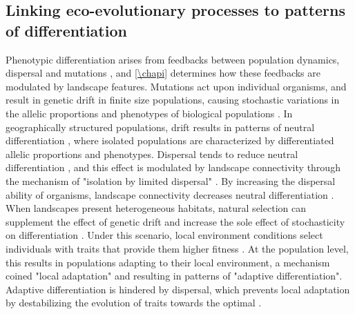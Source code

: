 \subsection{Linking eco-evolutionary processes to patterns of differentiation}

Phenotypic differentiation arises from feedbacks between population dynamics, dispersal and mutations \citep{hamilton2021population}, and \cref{\chapi} determines how these feedbacks are modulated by landscape features.
% 
Mutations act upon individual organisms, and result in genetic drift in finite size populations, causing stochastic variations in the allelic proportions and phenotypes of biological populations \citep{Slatkin1987a}.
% 
% 
In geographically structured populations, drift results in patterns of neutral differentiation \citep{Slatkin1987a}, where isolated populations are characterized by differentiated allelic proportions and phenotypes. 
% 
Dispersal tends to reduce neutral differentiation \citep{Slatkin1987a}, and this effect is modulated by landscape connectivity \citep{Wright1943,McRae2006,McRae2007} through the mechanism of "isolation by limited dispersal" \citep{Orsini2013}. By increasing the dispersal ability of organisms, landscape connectivity decreases neutral differentiation \citep{Lande1991}.
% 
When landscapes present heterogeneous habitats, natural selection can supplement the effect of genetic drift and increase the sole effect of stochasticity on differentiation \citep{fisher1958genetical}. Under this scenario, local environment conditions select individuals with traits that provide them higher fitness \citep{Gaither2018}. At the population level, this results in populations adapting to their local environment, a mechanism coined "local adaptation" \citep{Kawecki2004} and resulting in patterns of "adaptive differentiation". 
% 
% 
Adaptive differentiation is hindered by dispersal, which prevents local adaptation by destabilizing the evolution of traits towards the optimal \citep{Meszena1997,Debarre2013,Mirrahimi2020}.
% 
